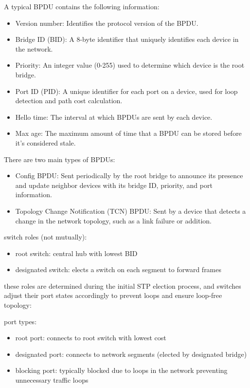 \documentclass{article}
\begin{document}
A typical BPDU contains the following information:
	\begin{itemize}
		\item Version number: Identifies the protocol version of the BPDU.
		\item Bridge ID (BID): A 8-byte identifier that uniquely identifies each device in the network.
		\item Priority: An integer value (0-255) used to determine which device is the root bridge.
		\item Port ID (PID): A unique identifier for each port on a device, used for loop detection and path cost calculation.
		\item Hello time: The interval at which BPDUs are sent by each device.
		\item Max age: The maximum amount of time that a BPDU can be stored before it's considered stale.
	\end{itemize}

There are two main types of BPDUs:
	\begin{itemize}
		\item Config BPDU: Sent periodically by the root bridge to announce its presence and update neighbor devices with its bridge ID, priority, and port information.
		\item Topology Change Notification (TCN) BPDU: Sent by a device that detects a change in the network topology, such as a link failure or addition.
	\end{itemize}


switch roles (not mutually):
	\begin{itemize}
		\item root switch: central hub with lowest BID
		\item designated switch: elects a switch on each segment to forward frames
	\end{itemize}
these roles are determined during the initial STP election process, and switches adjust their port states accordingly to prevent loops and ensure loop-free topology:

port types:
	\begin{itemize}
		\item root port: connects to root switch with lowest cost
		\item designated port: connects to network segments (elected by designated bridge)
		\item blocking port: typically blocked due to loops in the network preventing unnecessary traffic loops
	\end{itemize}
\end{document}

